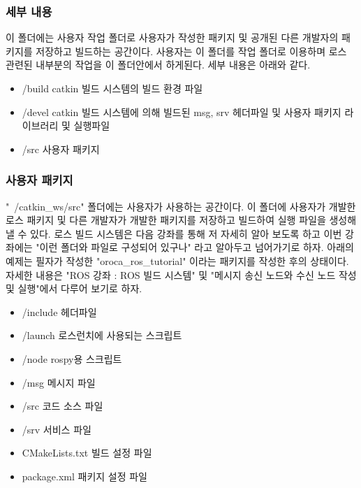 \subsubsection{세부 내용}

이 폴더에는 사용자 작업 폴더로 사용자가 작성한 패키지 및 공개된 다른 개발자의 패키지를 저장하고 빌드하는 공간이다. 사용자는 이 폴더를 작업 폴더로 이용하며 로스 관련된 내부분의 작업을 이 폴더안에서 하게된다. 세부 내용은 아래와 같다.

\begin{itemize}
\item /build catkin 빌드 시스템의 빌드 환경 파일
\item /devel catkin 빌드 시스템에 의해 빌드된 msg, srv 헤더파일 및 사용자 패키지 라이브러리 및 실행파일
\item /src 사용자 패키지
\end{itemize}

\subsubsection{사용자 패키지}

"~/catkin\_ws/src" 폴더에는 사용자가 사용하는 공간이다. 이 폴더에 사용자가 개발한 로스 패키지 및 다른 개발자가 개발한 패키지를 저장하고 빌드하여 실행 파일을 생성해 낼 수 있다. 로스 빌드 시스템은 다음 강좌를 통해 저 자세히 알아 보도록 하고 이번 강좌에는 "이런 폴더와 파일로 구성되어 있구나" 라고 알아두고 넘어가기로 하자. 아래의 예제는 필자가 작성한 "oroca\_ros\_tutorial" 이라는 패키지를 작성한 후의 상태이다. 자세한 내용은 "ROS 강좌 : ROS 빌드 시스템" 및 "메시지 송신 노드와 수신 노드 작성 및 실행"에서 다루어 보기로 하자.

\begin{itemize}
\item /include 헤더파일
\item /launch 로스런치에 사용되는 스크립트
\item /node rospy용 스크립트
\item /msg 메시지 파일
\item /src 코드 소스 파일
\item /srv 서비스 파일
\item CMakeLists.txt 빌드 설정 파일
\item package.xml 패키지 설정 파일
\end{itemize}

